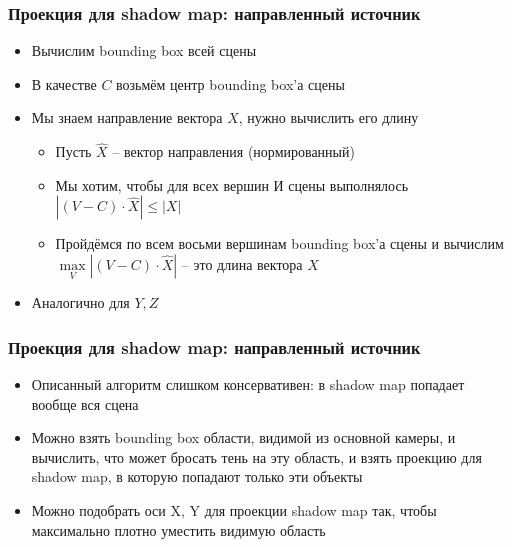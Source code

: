 \documentclass{beamer}
\begin{document}
\begin{frame}[fragile]
\frametitle{Проекция для shadow map: направленный источник}
\begin{itemize}
\item Вычислим bounding box всей сцены
\pause
\item В качестве \begin{math}C\end{math} возьмём центр bounding box'а сцены
\pause
\item Мы знаем направление вектора \begin{math}X\end{math}, нужно вычислить его длину
\begin{itemize}
\item Пусть \begin{math}\hat X\end{math} -- вектор направления (нормированный)
\item Мы хотим, чтобы для всех вершин \begin{math}И\end{math} сцены выполнялось \begin{math}|(V - C) \cdot \hat X| \leq |X|\end{math}
\pause
\item Пройдёмся по всем восьми вершинам bounding box'а сцены и вычислим \begin{math}\max\limits_V |(V - C) \cdot \hat X|\end{math} -- это длина вектора \begin{math}X\end{math}
\end{itemize}
\pause
\item Аналогично для \begin{math}Y, Z\end{math}
\end{itemize}
\end{frame}

\begin{frame}[fragile]
\frametitle{Проекция для shadow map: направленный источник}
\begin{itemize}
\item Описанный алгоритм слишком консервативен: в shadow map попадает вообще вся сцена
\pause
\item Можно взять bounding box области, видимой из основной камеры, и вычислить, что может бросать тень на эту область, и взять проекцию для shadow map, в которую попадают только эти объекты
\pause
\item Можно подобрать оси X, Y для проекции shadow map так, чтобы максимально плотно уместить видимую область
\end{itemize}
\end{frame}
\end{document}
